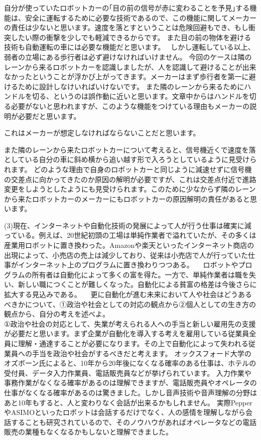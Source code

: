 \documentclass[11pt,a4paper]{jsarticle}
\begin{document}
自分が使っていたロボットカーの｢目の前の信号が赤に変わることを予見｣する機能は、安全に運転するために必要な技術であるので、この機能に関してメーカーの責任は少ないと思います。速度を落とすということは危険回避もでき、もし衝突したい際の衝撃を少しでも軽減できるからです。
また目の前の物体を避ける技術も自動運転の車には必要な機能だと思います。　%
しかし運転している以上、弱者の立場にある歩行者は必ず避けなければいけません。
今回のケースは隣のレーンから来るロボットカーを認識しましたが、人を認識して避けることが出来なかったということが浮かび上がってきます。メーカーはまず歩行者を第一に避けるために設計しなけいればいけないです。
また隣のレーンから来るためにハンドルを切る、というのは誤作動に近いと思います。文章中からはハンドルを切る必要がないと思われますが、このような機能をつけている理由もメーカーの説明が必要だと思います。

これはメーカーが想定しなければならないことだと思います。

また隣のレーンから来たロボットカーについて考えると、信号機近くで速度を落としている自分の車に斜め横から追い越す形で入ろうとしているように見受けられます。
どのような理由で自身のロボットカーと同じように減速せずに信号機の交差点に向かってきたのか原因の解明が必要ですが、これは交差点付近で進路変更をしようとしたようにも見受けられます。このために少なからず隣のレーンから来たロボットカーのメーカーにもロボットカーの原因解明の責任があると思います。

\newpage
 (3)現在、インターネットや自動化技術の発展によって人が行う仕事は確実に減っている。例えば、20世紀初頭の工場は単純作業者で溢れていたが、その多くは産業用ロボットに置き換わった。Amazonや楽天といったインターネット商店の出現によって、小売店の売上は減少しており、従来は小売店で人が行っていた仕事がインターネット上のプログラムに置き換わりつつある。
　ロボットやプログラムの所有者は自動化によって多くの富を得た。一方で、単純作業者は職を失い、新しい職につくことが難しくなった。自動化による貧富の格差は今後さらに拡大する見込みである。
　更に自動化が進む未来において人や社会はどうあるべきかについて、①政治や社会としての対応の観点から②個人としての生き方の観点から、自分の考えを述べよ。\\
 
①政治や社会の対応として、失業が考えられる人への手当と新しい雇用先の支援が必要だと思います。まず企業が自動化を導入する考えを雇用している従業員全員に理解・通達することが必要になります。その上で自動化によって失われる従業員への手当を政治や社会がするべきだと考えます。
オックスフォード大学のオズボーン氏によると、10年から20年後になくなる確率のある仕事は、ホテルの受付員、データ入力作業員、電話販売員などが挙げられています。
入力作業や事務作業がなくなる確率があるのは理解できますが、電話販売員やオペレータの仕事がなくなる確率があるのは驚きました。しかし音声技術や音声理解の分野はあと10年もすると、人と変わりなく会話が出来るかもしれません。
実際PepperやASIMOといったロボットは会話するだけでなく、人の感情を理解しながら会話することも研究されているので、そのノウハウがあればオペレータなどの電話販売の業種もなくなるかもしないと理解できました。
\end{document}

